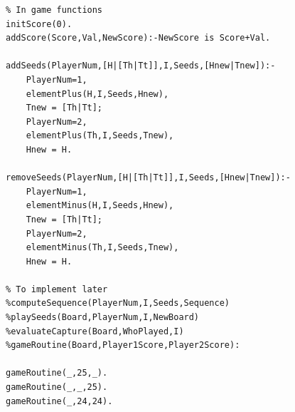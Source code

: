 \documentclass[15pt,a4paper]{article}
\begin{document}
\begin{verbatim}
% In game functions
initScore(0).
addScore(Score,Val,NewScore):-NewScore is Score+Val.

addSeeds(PlayerNum,[H|[Th|Tt]],I,Seeds,[Hnew|Tnew]):-
	PlayerNum=1,
	elementPlus(H,I,Seeds,Hnew),
	Tnew = [Th|Tt];
	PlayerNum=2,
	elementPlus(Th,I,Seeds,Tnew),
	Hnew = H.
	
removeSeeds(PlayerNum,[H|[Th|Tt]],I,Seeds,[Hnew|Tnew]):-
	PlayerNum=1,
	elementMinus(H,I,Seeds,Hnew),
	Tnew = [Th|Tt];
	PlayerNum=2,
	elementMinus(Th,I,Seeds,Tnew),
	Hnew = H.
		
% To implement later
%computeSequence(PlayerNum,I,Seeds,Sequence)
%playSeeds(Board,PlayerNum,I,NewBoard)
%evaluateCapture(Board,WhoPlayed,I)
%gameRoutine(Board,Player1Score,Player2Score):

gameRoutine(_,25,_).
gameRoutine(_,_,25).
gameRoutine(_,24,24).

\end{verbatim}
\end{document}
